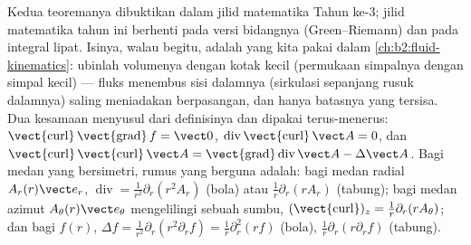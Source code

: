 \begin{remark}\label{rem:b2:maxwell-equations:whyadmitted}
Kedua teoremanya dibuktikan dalam jilid matematika Tahun ke-3;
jilid matematika tahun ini berhenti pada versi bidangnya
(Green--Riemann) dan pada integral lipat. Isinya, walau begitu, adalah
yang kita pakai dalam \cref{ch:b2:fluid-kinematics}: ubinlah volumenya dengan
kotak kecil (permukaan simpalnya dengan simpal kecil) --- fluks
menembus sisi dalamnya (sirkulasi sepanjang rusuk
dalamnya) saling meniadakan berpasangan, dan hanya batasnya yang tersisa. Dua kesamaan
menyusul dari definisinya dan dipakai terus-menerus:
$\operatorname{\vect{curl}}\operatorname{\vect{grad}}f = \vect 0$,
$\operatorname{div}\operatorname{\vect{curl}}\vect A = 0$, dan
$\operatorname{\vect{curl}}\operatorname{\vect{curl}}\vect A = \operatorname{\vect{grad}}
\operatorname{div}\vect A - \Delta\vect A$. Bagi medan yang bersimetri,
rumus yang berguna adalah: bagi medan radial $A_r(r)\vect e_r$, $\operatorname{div}
= \frac1{r^2}\partial_r(r^2A_r)$ (bola) atau $\frac1r\partial_r(rA_r)$
(tabung); bagi medan azimut $A_\theta(r)\vect e_\theta$ mengelilingi sebuah
sumbu, $(\operatorname{\vect{curl}})_z = \frac1r\partial_r(rA_\theta)$; dan bagi $f(r)$,
$\Delta f = \frac1{r^2}\partial_r(r^2\partial_rf) = \frac1r\partial_r^2(rf)$ (bola),
$\frac1r\partial_r(r\partial_rf)$ (tabung).
\end{remark}

